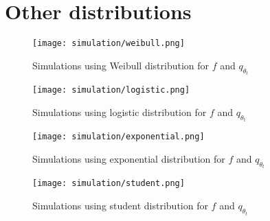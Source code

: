 \section{Other distributions}

\begin{figure}[H]
    \centering
    \texttt{[image: simulation/weibull.png]}
    \caption{Simulations using Weibull distribution for $f$ and $q_{\theta_t}$}
    \label{sim:weibull}
\end{figure}

\begin{figure}[H]
    \centering
    \texttt{[image: simulation/logistic.png]}
    \caption{Simulations using logistic distribution for $f$ and $q_{\theta_t}$}
    \label{sim:logistic}
\end{figure}

\begin{figure}[H]
    \centering
    \texttt{[image: simulation/exponential.png]}
    \caption{Simulations using exponential distribution for $f$ and $q_{\theta_t}$}
    \label{sim:exponential}
\end{figure}

\begin{figure}[H]
    \centering
    \texttt{[image: simulation/student.png]}
    \caption{Simulations using student distribution for $f$ and $q_{\theta_t}$}
    \label{sim:student}
\end{figure}